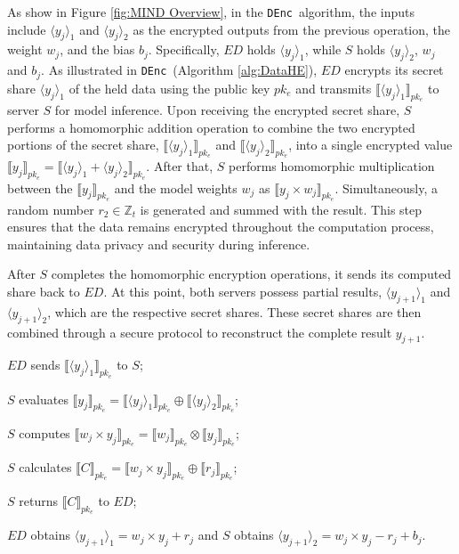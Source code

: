 \documentclass[conference]{IEEEtran}
\newcommand{\DEnc}{\texttt{DEnc}}
\begin{document}
As show in Figure \ref{fig:MIND Overview}, in the \DEnc~algorithm, the inputs include $\langle y_j\rangle_1$ and $\langle  y_j\rangle_2$ as the encrypted outputs from the previous operation, the weight $w_j$, and the bias $b_j$. Specifically, $ED$ holds $\langle y_j\rangle_1$, while $S$ holds $\langle y_j\rangle_2$, $w_j$ and $b_j$. As illustrated in \DEnc~(Algorithm \ref{alg:DataHE}), $ED$ encrypts its secret share $\langle y_j \rangle_1$ of the held data using the public key $pk_e$ and transmits $\llbracket\langle y_j \rangle_1\rrbracket_{pk_e}$ to server $S$ for model inference. Upon receiving the encrypted secret share, $S$ performs a homomorphic addition operation to combine the two encrypted portions of the secret share, $\llbracket\langle y_j \rangle_1\rrbracket_{pk_e}$ and $\llbracket\langle y_j \rangle_2\rrbracket_{pk_e}$, into a single encrypted value $\llbracket y_j \rrbracket_{pk_e}=\llbracket \langle y_j \rangle_1 +  \langle y_j \rangle_2\rrbracket_{pk_e}$. After that, $S$ performs homomorphic multiplication between the $\llbracket y_j \rrbracket_{pk_e}$ and the model weights $w_j$ as $\llbracket y_j\times w_j \rrbracket_{pk_e}$. Simultaneously, a random number $r_2 \in \mathbb{Z}_t$ is generated and summed with the result. This step ensures that the data remains encrypted throughout the computation process, maintaining data privacy and security during inference.
 
After $S$ completes the homomorphic encryption operations, it sends its computed share back to $ED$. At this point, both servers possess partial results, $\langle y_{j+1} \rangle_1$ and $\langle y_{j+1} \rangle_2$, which are the respective secret shares. These secret shares are then combined through a secure protocol to reconstruct the complete result $y_{j+1}$.
\begin{algorithm}[htbp]
	\caption{\DEnc$(\langle y_j \rangle_1,\langle y_j \rangle_2,w_{j},b_{j}) \rightarrow (\langle y_{j+1}\rangle_1,\langle y_{j+1}\rangle_2)$\!\!\!\!\!}
    \label{alg:DataHE}
    \LinesNumbered
    $ED$ sends $\llbracket\langle y_j \rangle_1\rrbracket_{pk_e}$ to $S$;
    
    $S$ evaluates $\llbracket y_j \rrbracket_{pk_e} = \llbracket \langle y_j \rangle_1 \rrbracket_{pk_e}  \oplus  \llbracket\langle y_j\rangle_2\rrbracket_{pk_e}$;
    
    $S$ computes $\llbracket w_{j} \times y_j \rrbracket_{pk_e} = \llbracket w_{j} \rrbracket_{pk_e} \otimes \llbracket  y_{j} \rrbracket_{pk_e}$;
    
    $S$ calculates $\llbracket C \rrbracket_{pk_e} = \llbracket w_{j} \times y_{j} \rrbracket_{pk_e} \oplus \llbracket r_{j} \rrbracket_{pk_e}$;
    
    $S$ returns $\llbracket C \rrbracket_{pk_e}$ to $ED$;
    
    $ED$ obtains $\langle y_{j+1}\rangle_1=w_{j} \times y_{j}+r_{j}$ and $S$ obtains $\langle y_{j+1} \rangle_2 = w_j \times y_{j}-r_j+b_j$.
\end{algorithm}
\end{document}

